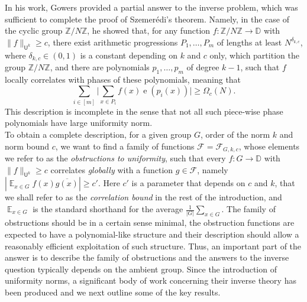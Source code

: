 \documentclass[a4paper,11pt]{article}
\numberwithin{theorem}{section}
\theoremstyle{definition}
\newcommand{\on}[1]{
	\operatorname{#1}
}
\newcommand\ex{\mathop{\mathbb{E}}}
\begin{document}
In his work, Gowers provided a partial answer to the inverse problem, which was sufficient to complete the proof of Szemer\'edi's theorem. Namely, in the case of the cyclic group $\mathbb{Z}/N\mathbb{Z}$, he showed that, for any function $f : \mathbb{Z}/N\mathbb{Z} \to \mathbb{D}$ with $\|f\|_{\mathsf{U}^k} \geq c$, there exist arithmetic progressions $P_1, \dots, P_m$ of lengths at least $N^{\delta_{k,c}}$, where $\delta_{k,c} \in (0,1)$ is a constant depending on $k$ and $c$ only, which partition  the group $\mathbb{Z}/N\mathbb{Z}$, and there are polynomials $p_1, \dots, p_m$ of degree $k - 1$, such that $f$ locally correlates with phases of these polynomials, meaning that
\[\sum_{i \in [m]}\Big|\sum_{x \in P_i} f(x) \on{e}(p_i(x))\Big| \geq \Omega_c(N).\]
This description is incomplete in the sense that not all such piece-wise phase polynomials have large uniformity norm.\\

To obtain a complete description, for a given group $G$, order of the norm $k$ and norm bound $c$, we want to find a family of functions $\mathcal{F} = \mathcal{F}_{G, k ,c}$, whose elements we refer to as the \textit{obstructions to uniformity}, such that every $f : G \to \mathbb{D}$ with $\|f\|_{\mathsf{U}^k} \geq c$ correlates \textit{globally} with a function $g \in \mathcal{F}$, namely $|\ex_{x \in G} f(x) \overline{g(x)}| \geq c'$. Here $c'$ is a parameter that depends on $c$ and $k$, that we shall refer to as the \textit{correlation bound} in the rest of the introduction, and $\ex_{x \in G}$ is the standard shorthand for the average $\frac{1}{|G|}\sum_{x \in G}$. The family of obstructions should be in a certain sense minimal, the obstruction functions are expected to have a polynomial-like structure and their description should allow a reasonably efficient exploitation of such structure. Thus, an important part of the answer is to describe the family of obstructions and the answers to the inverse question typically depends on the ambient group. Since the introduction of uniformity norms, a significant body of work concerning their inverse theory has been produced and we next outline some of the key results.\\
\end{document}
